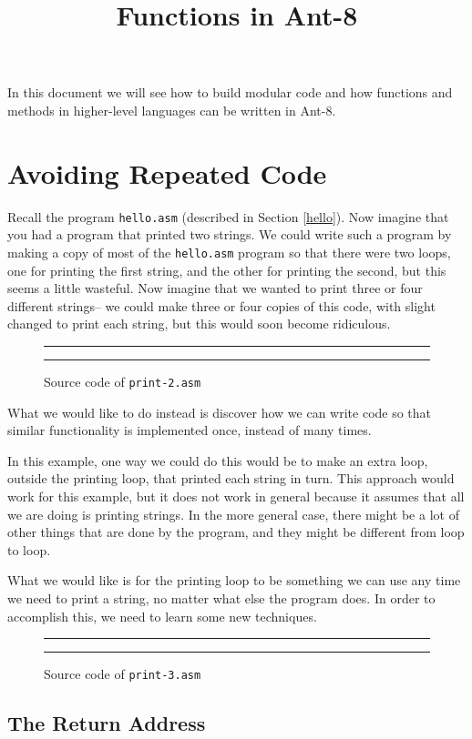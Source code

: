 \documentclass[makeidx,psfig]{article}
\title{Functions in {\sc Ant-8}}
\begin{document}
In this document we will see how to build modular code and how
functions and methods in higher-level languages can be written in {\sc
Ant-8}.

\section{Avoiding Repeated Code}

Recall the program {\tt hello.asm} (described in Section \ref{hello}). 
Now imagine that you had a program that printed two strings.  We could
write such a program by making a copy of most of the {\tt hello.asm}
program so that there were two loops, one for printing the first
string, and the other for printing the second, but this seems a little
wasteful.  Now imagine that we wanted to print three or four different
strings-- we could make three or four copies of this code, with slight
changed to print each string, but this would soon become ridiculous.

\begin{figure}
\caption{Source code of {\tt print-2.asm}}
\hrule

\hrule
\end{figure}

What we would like to do instead is discover how we can write code so
that similar functionality is implemented once, instead of many times.

In this example, one way we could do this would be to make an extra
loop, outside the printing loop, that printed each string in turn. 
This approach would work for this example, but it does not work in
general because it assumes that all we are doing is printing strings. 
In the more general case, there might be a lot of other things that
are done by the program, and they might be different from loop to
loop.

What we would like is for the printing loop to be something we can use
any time we need to print a string, no matter what else the program
does.  In order to accomplish this, we need to learn some new
techniques.

\begin{figure}
\caption{Source code of {\tt print-3.asm}}
\hrule

\hrule
\end{figure}

\subsection{The Return Address}
\end{document}
